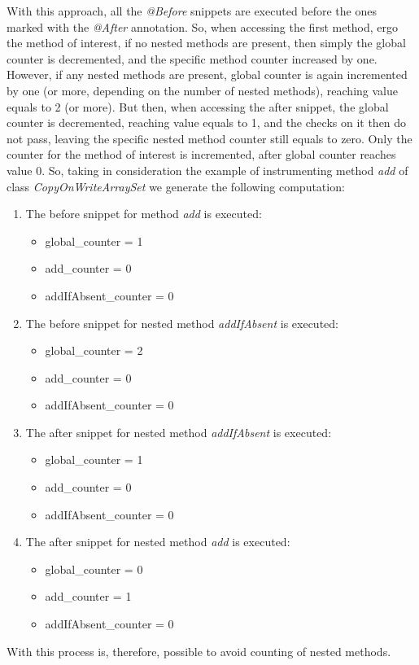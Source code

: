 \documentclass[]{usiinfthesis}
\begin{document}
\noindent
With this approach, all the \textit{@Before} snippets are executed before the ones marked with the \textit{@After} annotation. So, when accessing the first method, ergo the method of interest, if no nested methods are present, then simply the global counter is decremented, and the specific method counter increased by one. However, if any nested methods are present, global counter is again incremented by one (or more, depending on the number of nested methods), reaching value equals to 2 (or more). But then, when accessing the after snippet, the global counter is decremented, reaching value equals to 1, and the checks on it then do not pass, leaving the specific nested method counter still equals to zero. Only the counter for the method of interest is incremented, after global counter reaches value 0. So, taking in consideration the example of instrumenting method \textit{add} of class \textit{CopyOnWriteArraySet} we generate the following computation:
\begin{enumerate}
    \item The before snippet for method \textit{add} is executed:
    \begin{itemize}
        \item global\_counter = 1
        \item add\_counter = 0
        \item addIfAbsent\_counter = 0
    \end{itemize}
    \item The before snippet for nested method \textit{addIfAbsent} is executed:
    \begin{itemize}
        \item global\_counter = 2
        \item add\_counter = 0
        \item addIfAbsent\_counter = 0
    \end{itemize}
    \item The after snippet for nested method \textit{addIfAbsent} is executed:
    \begin{itemize}
        \item global\_counter = 1
        \item add\_counter = 0
        \item addIfAbsent\_counter = 0
    \end{itemize}
    \item The after snippet for nested method \textit{add} is executed:
    \begin{itemize}
        \item global\_counter = 0
        \item add\_counter = 1
        \item addIfAbsent\_counter = 0
    \end{itemize}
\end{enumerate}
With this process is, therefore, possible to avoid counting of nested methods.
\end{document}
